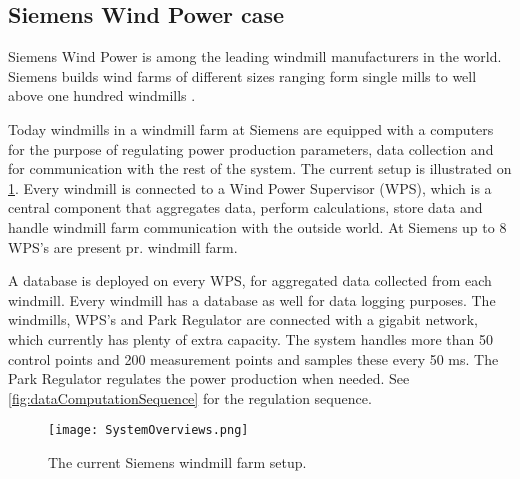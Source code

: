 \subsection{Siemens Wind Power case}
\label{sec:SiemensCase}
Siemens Wind Power is among the leading windmill manufacturers in the world. Siemens builds wind farms of different sizes ranging form single mills to well above one hundred windmills \cite{simensOffShoreProjects, simensOnShoreProjects}.

Today windmills in a windmill farm at Siemens are equipped with a computers for the purpose of regulating power production parameters, data collection and for communication with the rest of the system. The current setup is illustrated on \cref{fig:currentSiemensSetup}. Every windmill is connected to a Wind Power Supervisor (WPS), which is a central component that aggregates data, perform calculations, store data and handle windmill farm communication with the outside world. At Siemens up to 8 WPS's are present pr. windmill farm.

A database is deployed on every WPS, for aggregated data collected from each windmill. Every windmill has a database as well for data logging purposes. The windmills, WPS's and Park Regulator are connected with a gigabit network, which currently has plenty of extra capacity. The system handles more than 50 control points and 200 measurement points and samples these every 50 ms. The Park Regulator regulates the power production when needed. See \cref{fig:dataComputationSequence} for the regulation sequence.

\begin{figure}
	\centering
	\texttt{[image: SystemOverviews.png]} 
	\caption[Illustrates the current Siemens windmill farm setup]{
		\label{fig:currentSiemensSetup} 
		\footnotesize{%
			The current Siemens windmill farm setup.
		}
	}
\end{figure}


